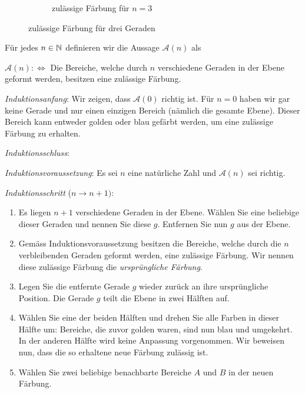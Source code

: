 \begin{myanswer}[myexercise:0207]
\begin{figure}[H]
\begin{subfigure}[b]{0.45\textwidth}
			\caption{zulässige Färbung für $n=3$}
			\label{subfig:3linesFilled}
		\end{subfigure}
		\caption{zulässige Färbung für drei Geraden}
		\label{fig:3lines}
	\end{figure}
	Für jedes $n\in\mathbb{N}$ definieren wir die Aussage $\mathcal{A}(n)$ als
	\begin{center}
		$\mathcal{A}(n) :\iff $ Die Bereiche, welche durch $n$ verschiedene Geraden in der Ebene geformt werden, besitzen eine zulässige Färbung.
	\end{center}
	\begin{aenum}
		\item \textit{Induktionsanfang}: Wir zeigen, dass $\mathcal{A}(0)$ richtig ist. Für $n=0$ haben wir gar keine Gerade und nur einen einzigen Bereich (nämlich die gesamte Ebene). Dieser Bereich kann entweder golden oder blau gefärbt werden, um eine zulässige Färbung zu erhalten.
		\item \textit{Induktionsschluss}:
		\begin{renum}
			\item \textit{Induktionsvoraussetzung}: Es sei $n$ eine natürliche Zahl und $\mathcal{A}(n)$ sei richtig.
			\item \textit{Induktionsschritt} ($n\to n+1)$:
			\begin{enumerate}
				\item Es liegen $n+1$ verschiedene Geraden in der Ebene. Wählen Sie eine beliebige dieser Geraden und nennen Sie diese $g$. Entfernen Sie nun $g$ aus der Ebene.
				\item Gemäss Induktionsvoraussetzung besitzen die Bereiche, welche durch die $n$ verbleibenden Geraden geformt werden, eine zulässige Färbung. Wir nennen diese zulässige Färbung die \textit{ursprüngliche Färbung}.
				\item Legen Sie die entfernte Gerade $g$ wieder zurück an ihre ursprüngliche Position. Die Gerade $g$ teilt die Ebene in zwei Hälften auf.
				\item Wählen Sie eine der beiden Hälften und drehen Sie alle Farben in dieser Hälfte um: Bereiche, die zuvor golden waren, sind nun blau und umgekehrt. In der anderen Hälfte wird keine Anpassung vorgenommen. Wir beweisen nun, dass die so erhaltene neue Färbung zulässig ist.
				\item Wählen Sie zwei beliebige benachbarte Bereiche $A$ und $B$ in der neuen Färbung.

\end{enumerate}
\end{renum}
\end{aenum}
\end{myanswer}
